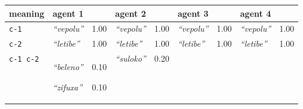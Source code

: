 
{\renewcommand{\arraystretch}{1.5}
\begin{tabular}{@{}p{1.2cm}|p{1.6cm}@{}p{0.8cm}@{}|p{1.6cm}@{}p{0.8cm}@{}|p{1.6cm}@{}p{0.8cm}@{}|p{1.6cm}@{}p{0.8cm}@{}}
meaning & agent 1 &  & agent 2 &  & agent 3 &  & agent 4 & \\
\hline
\texttt{c-1}&\textit{``vepolu''}
&1.00&\textit{``vepolu''}
&1.00&\textit{``vepolu''}
&1.00&\textit{``vepolu''}
&1.00\\
\hline
\texttt{c-2}&\textit{``letibe''}
&1.00&\textit{``letibe''}
&1.00&\textit{``letibe''}
&1.00&\textit{``letibe''}
&1.00\\
\hline
\texttt{c-1 c-2}&\textit{``beleno''}

\textit{``zifuxa''}
&0.10

0.10&\textit{``suloko''}
&0.20&&&&
\end{tabular}}
